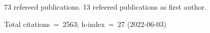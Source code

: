 73 refereed publications. 13 refeered publications as first author.

Total citations~=~2563; h-index~=~27 (2022-06-03)